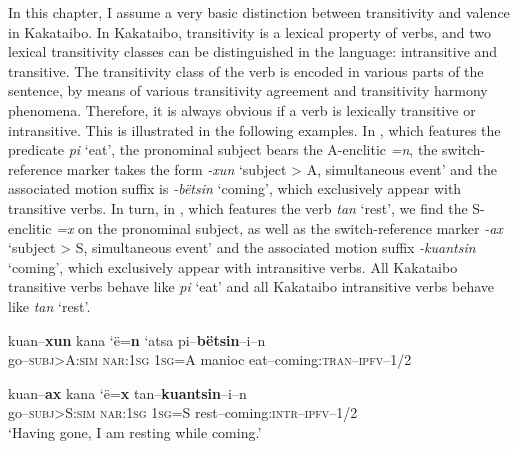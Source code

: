 \documentclass[output=paper,colorlinks,citecolor=brown,modfonts,nonflat]{langscibook}
\begin{document}
In this chapter, I assume a very basic distinction between transitivity and valence in Kakataibo. In Kakataibo, transitivity is a lexical property of verbs, and two lexical transitivity classes can be distinguished in the language: intransitive and transitive. The transitivity class of the verb is encoded in various parts of the sentence, by means of various transitivity agreement and transitivity harmony phenomena. Therefore, it is always obvious if a verb is lexically transitive or intransitive. This is illustrated in the following examples. In , which features the predicate \textit{pi} ‘eat’, the pronominal subject bears the A-enclitic \textit{=n}, the switch-reference marker takes the form \textit{{}-xun} ‘subject > A, simultaneous event’ and the associated motion suffix is \textit{{}-bëtsin} ‘coming’, which exclusively appear with transitive verbs. In turn, in , which features the verb \textit{tan} ‘rest’, we find the S-enclitic \textit{=x} on the pronominal subject, as well as the switch-reference marker \textit{{}-ax} ‘subject > S, simultaneous event’ and the associated motion suffix \textit{{}-kuantsin} ‘coming’, which exclusively appear with intransitive verbs. All Kakataibo transitive verbs behave like \textit{pi} ‘eat’ and all Kakataibo intransitive verbs behave like \textit{tan} ‘rest’.

\ea%
    \label{ex:zariquiey:3}
    \gll kuan–\textbf{xun} kana ‘ë=\textbf{n} ‘atsa    pi–\textbf{bëtsin}–i–n\\
            go\textsc{–subj>A:sim} \textsc{nar:1sg} \textsc{1sg=A} manioc eat–coming\textsc{:tran–ipfv}{–1/2}\\
\z

\ea%
    \label{ex:zariquiey:4}
    \gll    kuan–\textbf{ax} kana ‘ë=\textbf{x} tan–\textbf{kuantsin}–i–n\\
            go–\textsc{subj>S:sim} \textsc{nar:1sg} \textsc{1sg=S} rest–coming:\textsc{intr–ipfv}–1/2\\
    \glt    ‘Having gone, I am resting while coming.’
\z
\end{document}
